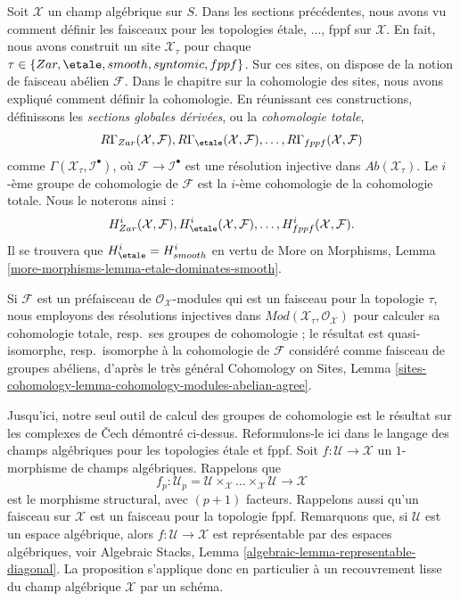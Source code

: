 \noindent
Soit $\mathcal{X}$ un champ algébrique sur $S$. Dans les sections précédentes,
nous avons vu comment définir les faisceaux pour les topologies étale, ..., fppf
sur $\mathcal{X}$. En fait, nous avons construit un site
$\mathcal{X}_\tau$ pour chaque $\tau \in \{Zar, \etale, smooth, syntomic,
fppf\}$. Sur ces sites, on dispose de la notion de faisceau abélien $\mathcal{F}$.
Dans le chapitre sur la cohomologie des sites, nous avons expliqué comment définir la
cohomologie. En réunissant ces constructions, définissons les
{\it sections globales dérivées}, ou la {\it cohomologie totale},
$$
R\Gamma_{Zar}(\mathcal{X}, \mathcal{F}),
R\Gamma_\etale(\mathcal{X}, \mathcal{F}), \ldots,
R\Gamma_{fppf}(\mathcal{X}, \mathcal{F})
$$
comme $\Gamma(\mathcal{X}_\tau, \mathcal{I}^\bullet)$, où
$\mathcal{F} \to \mathcal{I}^\bullet$ est une résolution injective
dans $\textit{Ab}(\mathcal{X}_\tau)$. Le $i$-ème groupe de cohomologie de $\mathcal{F}$
est la $i$-ème cohomologie de la cohomologie totale. Nous le noterons
ainsi :
$$
H^i_{Zar}(\mathcal{X}, \mathcal{F}),
H^i_\etale(\mathcal{X}, \mathcal{F}), \ldots,
H^i_{fppf}(\mathcal{X}, \mathcal{F}).
$$
Il se trouvera que $H^i_\etale = H^i_{smooth}$ en vertu de
More on Morphisms, Lemma \ref{more-morphisms-lemma-etale-dominates-smooth}.

\medskip\noindent
Si $\mathcal{F}$ est un préfaisceau de $\mathcal{O}_\mathcal{X}$-modules
qui est un faisceau pour la topologie $\tau$, nous employons des résolutions
injectives dans $\textit{Mod}(\mathcal{X}_\tau, \mathcal{O}_\mathcal{X})$
pour calculer sa cohomologie totale, resp.\ ses groupes de cohomologie ;
le résultat est quasi-isomorphe, resp.\ isomorphe à la cohomologie de
$\mathcal{F}$ considéré comme faisceau de groupes abéliens, d'après le très général
Cohomology on Sites, Lemma
\ref{sites-cohomology-lemma-cohomology-modules-abelian-agree}.

\medskip\noindent
Jusqu'ici, notre seul outil de calcul des groupes de cohomologie est le résultat sur les
complexes de {\v C}ech démontré ci-dessus. Reformulons-le ici dans le langage
des champs algébriques pour les topologies étale et fppf. Soit
$f : \mathcal{U} \to \mathcal{X}$ un $1$-morphisme de champs algébriques.
Rappelons que
$$
f_p : \mathcal{U}_p =
\mathcal{U} \times_\mathcal{X} \ldots \times_\mathcal{X} \mathcal{U}
\longrightarrow
\mathcal{X}
$$
est le morphisme structural, avec $(p + 1)$ facteurs. Rappelons aussi
qu'un faisceau sur $\mathcal{X}$ est un faisceau pour la topologie fppf. Remarquons
que, si $\mathcal{U}$ est un espace algébrique, alors
$f : \mathcal{U} \to \mathcal{X}$ est représentable par des espaces algébriques,
voir
Algebraic Stacks, Lemma \ref{algebraic-lemma-representable-diagonal}.
La proposition s'applique donc en particulier à un recouvrement lisse du
champ algébrique $\mathcal{X}$ par un schéma.

